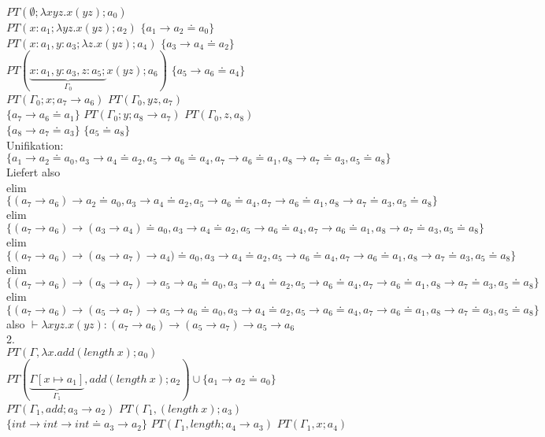 \documentclass{article}
\begin{document}
	$PT(\emptyset; \lambda x y z.x(y z); a_0)$\\
	$PT(x:a_1; \lambda y z.x(y z); a_2)$   $\{a_1\to a_2 \doteq a_0\}$\\
	$PT(x:a_1, y:a_3; \lambda z.x(y z); a_4)$   $\{a_3\to a_4 \doteq a_2\}$\\
	$PT(\underbrace{x:a_1, y:a_3, z:a_5;}_{\Gamma_0} x(y z); a_6)$   $\{a_5\to a_6 \doteq a_4\}$\\
	$PT(\Gamma_0; x; a_7\to a_6)$ $PT(\Gamma_0, yz, a_7)$\\
	$\{a_7\to a_6 \doteq a_1\}$ $PT(\Gamma_0; y; a_8\to a_7)$ $PT(\Gamma_0,z,a_8)$\\
	$\{a_8\to a_7\doteq a_3\}$ $\{a_5\doteq a_8\}$\\
	Unifikation:\\
	$\{a_1\to a_2 \doteq a_0,a_3\to a_4 \doteq a_2,a_5\to a_6 \doteq a_4,a_7\to a_6 \doteq a_1,a_8\to a_7\doteq a_3,a_5\doteq a_8\}$\\
	Liefert also\\
	elim $\{(a_7\to a_6)\to a_2 \doteq a_0,a_3\to a_4 \doteq a_2,a_5\to a_6 \doteq a_4,a_7\to a_6 \doteq a_1,a_8\to a_7\doteq a_3,a_5\doteq a_8\}$\\
	elim $\{(a_7\to a_6)\to (a_3\to a_4) \doteq a_0,a_3\to a_4 \doteq a_2,a_5\to a_6 \doteq a_4
	,a_7\to a_6 \doteq a_1,a_8\to a_7\doteq a_3,a_5\doteq a_8\}$\\
	elim $\{(a_7\to a_6)\to (a_8\to a_7)\to a_4) \doteq a_0,a_3\to a_4 \doteq a_2,a_5\to a_6 \doteq a_4,a_7\to a_6 \doteq a_1,a_8\to a_7\doteq a_3,a_5\doteq a_8\}$\\
	elim $\{(a_7\to a_6)\to (a_8\to a_7)\to a_5\to a_6 \doteq a_0,a_3\to a_4 \doteq a_2,a_5\to a_6 \doteq a_4,a_7\to a_6 \doteq a_1,a_8\to a_7\doteq a_3,a_5\doteq a_8\}$\\
	elim $\{(a_7\to a_6)\to (a_5\to a_7)\to a_5\to a_6 \doteq a_0,a_3\to a_4 \doteq a_2,a_5\to a_6 \doteq a_4,a_7\to a_6 \doteq a_1,a_8\to a_7\doteq a_3,a_5\doteq a_8\}$\\
	also $\vdash \lambda xyz.x(yz): (a_7\to a_6)\to (a_5\to a_7)\to a_5\to a_6$\\
	2.\\
	$PT(\Gamma, \lambda x.add (length\ x); a_0)$\\
	$PT(\underbrace{\Gamma[x\mapsto a_1]}_{\Gamma_1}, add (length\ x); a_2)\cup \{a_1\to a_2\doteq a_0\}$\\
	$PT(\Gamma_1, add ; a_3\to a_2)$ $PT(\Gamma_1, (length\ x); a_3)$\\
	$\{int\to int\to int \doteq a_3\to a_2\}$ $PT(\Gamma_1, length; a_4\to a_3)$ $PT(\Gamma_1, x; a_4)$\\
\end{document}
